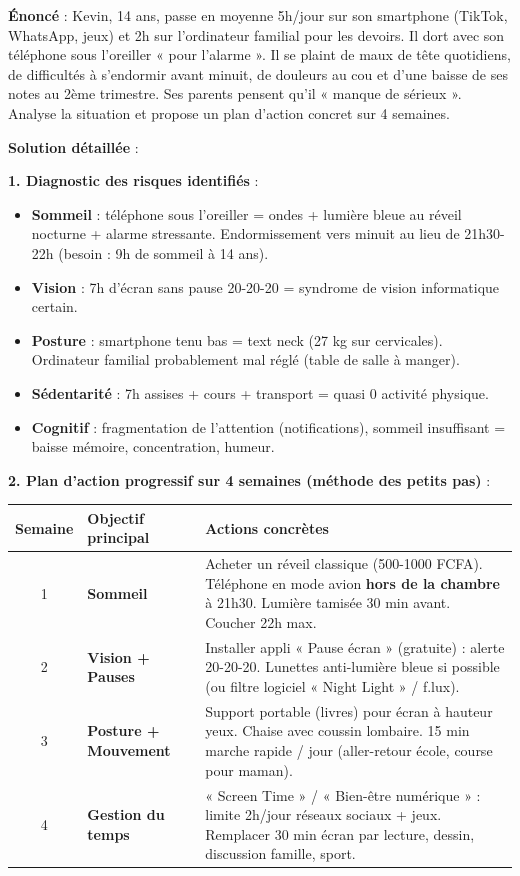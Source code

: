 \documentclass[11pt]{article}
\begin{document}
\begin{exoresolu}
\textbf{Énoncé} : Kevin, 14 ans, passe en moyenne 5h/jour sur son smartphone (TikTok, WhatsApp, jeux) et 2h sur l'ordinateur familial pour les devoirs. Il dort avec son téléphone sous l'oreiller « pour l'alarme ». Il se plaint de maux de tête quotidiens, de difficultés à s'endormir avant minuit, de douleurs au cou et d'une baisse de ses notes au 2ème trimestre. Ses parents pensent qu'il « manque de sérieux ». Analyse la situation et propose un plan d'action concret sur 4 semaines.

\tcblower
\textbf{Solution détaillée} :

\textbf{1. Diagnostic des risques identifiés} :
\begin{itemize}
    \item \textbf{Sommeil} : téléphone sous l'oreiller = ondes + lumière bleue au réveil nocturne + alarme stressante. Endormissement vers minuit au lieu de 21h30-22h (besoin : 9h de sommeil à 14 ans).
    \item \textbf{Vision} : 7h d'écran sans pause 20-20-20 = syndrome de vision informatique certain.
    \item \textbf{Posture} : smartphone tenu bas = text neck (27 kg sur cervicales). Ordinateur familial probablement mal réglé (table de salle à manger).
    \item \textbf{Sédentarité} : 7h assises + cours + transport = quasi 0 activité physique.
    \item \textbf{Cognitif} : fragmentation de l'attention (notifications), sommeil insuffisant = baisse mémoire, concentration, humeur.
\end{itemize}

\textbf{2. Plan d'action progressif sur 4 semaines (méthode des petits pas)} :

\begin{center}
\begin{tabularx}{\linewidth}{|c|X|X|}
\hline
\rowcolor{popblueL}
\textbf{Semaine} & \textbf{Objectif principal} & \textbf{Actions concrètes} \\
\hline
1 & \textbf{Sommeil} & Acheter un réveil classique (500-1000 FCFA). Téléphone en mode avion \textbf{hors de la chambre} à 21h30. Lumière tamisée 30 min avant. Coucher 22h max. \\
\hline
2 & \textbf{Vision + Pauses} & Installer appli « Pause écran » (gratuite) : alerte 20-20-20. Lunettes anti-lumière bleue si possible (ou filtre logiciel « Night Light » / f.lux). \\
\hline
3 & \textbf{Posture + Mouvement} & Support portable (livres) pour écran à hauteur yeux. Chaise avec coussin lombaire. 15 min marche rapide / jour (aller-retour école, course pour maman). \\
\hline
4 & \textbf{Gestion du temps} & « Screen Time » / « Bien-être numérique » : limite 2h/jour réseaux sociaux + jeux. Remplacer 30 min écran par lecture, dessin, discussion famille, sport. \\
\hline
\end{tabularx}
\end{center}


\end{exoresolu}
\end{document}
